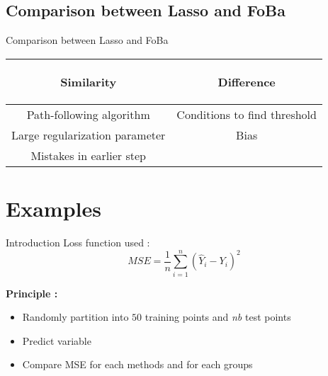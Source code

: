 \documentclass[unknownkeysallowed]{beamer}
\begin{document}

\subsection*{Comparison between Lasso and FoBa}

\begin{frame}{Comparison between Lasso and FoBa}

\begin{table}
        \centering
        \begin{tabular}{| c | c |}
        \hline
        \begin{bf} Similarity \end{bf} &
        \begin{bf} Difference \end{bf} \\
        \hline
        Path-following algorithm &  Conditions to find threshold \\
        Large regularization parameter & Bias \\
        Mistakes in earlier step &  \\
        \hline
        \end{tabular}
    \end{table}
\end{frame}



\section{Examples}
\label{sec:example}

\begin{frame}{Introduction}
Loss function used : \[MSE = \frac{1}{n} \sum_{i=1}^n (\hat{Y}_i-Y_i)^2\]

\textbf{Principle : }
\begin{itemize}
    \item Randomly partition into $50$ training points and \textit{nb} test points
    \item Predict variable
    \item Compare MSE for each methods and for each groups
\end{itemize}
\end{frame}
\end{document}
